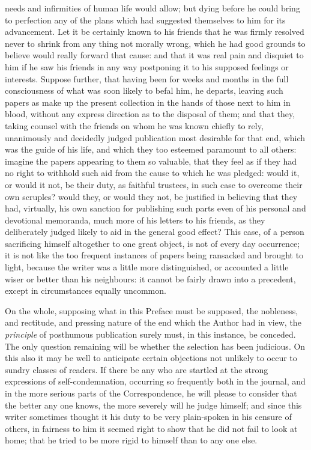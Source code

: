 needs and infirmities of human life would allow; but dying before he
could bring to perfection any of the plans which had suggested
themselves to him for its advancement. Let it be certainly known to
his friends that he was firmly resolved never to shrink from any thing
not morally wrong, which he had good grounds to believe would really
forward that cause: and that it was real pain and disquiet to him if
he saw his friends in any way postponing it to his supposed feelings
or interests. Suppose further, that having been for weeks and months
in the full consciousness of what was soon likely to befal him, he
departs, leaving such papers as make up the present collection in the
hands of those next to him in blood, without any express direction as
to the disposal of them; and that they, taking counsel with the
friends on whom he was known chiefly to rely, unanimously and
decidedly judged publication most desirable for that end, which was
the guide of his life, and which they too esteemed paramount to all
others: imagine the papers appearing to them so valuable, that they
feel as if they had no right to withhold such aid from the cause to
which he was pledged: would it, or would it not, be their duty, as
faithful trustees, in such case to overcome their own scruples? would
they, or would they not, be justified in believing that they had,
virtually, his own sanction for publishing such parts even of his
personal and devotional memoranda, much more of his letters to his
friends, as they deliberately judged likely to aid in the general good
effect? This case, of a person sacrificing himself altogether to one
great object, is not of every day occurrence; it is not like the too
frequent instances of papers being ransacked and brought to light,
because the writer was a little more distinguished, or accounted a
little wiser or better than his neighbours: it cannot be fairly drawn
into a precedent, except in circumstances equally uncommon.

On the whole, supposing what
in this Preface must be supposed, the nobleness, and rectitude, and
pressing nature of the end which the Author had in view, the \emph{principle}
of posthumous publication surely must, in this instance, be conceded.
The only question remaining will be whether the selection has been
judicious. On this also it may be well to anticipate certain
objections not unlikely to occur to sundry classes of readers. If
there be any who are startled at the strong expressions of
self-condemnation, occurring so frequently both in the journal, and in
the more serious parts of the Correspondence, he will please to
consider that the better any one knows, the more severely will he
judge himself; and since this writer sometimes thought it his duty to
be very plain-spoken in his censure of others, in fairness to him it
seemed right to show that he did not fail to look at home; that he
tried to be more rigid to himself than to any one else.


